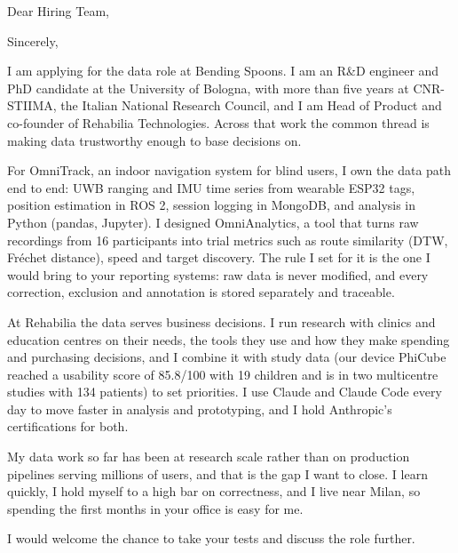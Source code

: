 \documentclass[11pt,a4paper,sans]{moderncv}
\begin{document}

\opening{Dear Hiring Team,}
\closing{Sincerely,}
\makelettertitle

I am applying for the data role at Bending Spoons. I am an R\&D engineer and PhD candidate at the University of Bologna, with more than five years at CNR-STIIMA, the Italian National Research Council, and I am Head of Product and co-founder of Rehabilia Technologies. Across that work the common thread is making data trustworthy enough to base decisions on.

For OmniTrack, an indoor navigation system for blind users, I own the data path end to end: UWB ranging and IMU time series from wearable ESP32 tags, position estimation in ROS 2, session logging in MongoDB, and analysis in Python (pandas, Jupyter). I designed OmniAnalytics, a tool that turns raw recordings from 16 participants into trial metrics such as route similarity (DTW, Fr\'echet distance), speed and target discovery. The rule I set for it is the one I would bring to your reporting systems: raw data is never modified, and every correction, exclusion and annotation is stored separately and traceable.

At Rehabilia the data serves business decisions. I run research with clinics and education centres on their needs, the tools they use and how they make spending and purchasing decisions, and I combine it with study data (our device PhiCube reached a usability score of 85.8/100 with 19 children and is in two multicentre studies with 134 patients) to set priorities. I use Claude and Claude Code every day to move faster in analysis and prototyping, and I hold Anthropic's certifications for both.

My data work so far has been at research scale rather than on production pipelines serving millions of users, and that is the gap I want to close. I learn quickly, I hold myself to a high bar on correctness, and I live near Milan, so spending the first months in your office is easy for me.

I would welcome the chance to take your tests and discuss the role further.

\makeletterclosing
\end{document}

